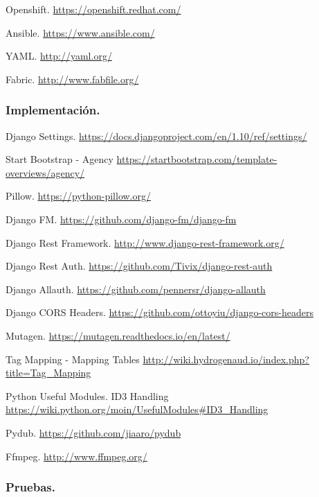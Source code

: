  Openshift. \url{https://openshift.redhat.com/}

 Ansible. \url{https://www.ansible.com/}

 YAML. \url{http://yaml.org/}

 Fabric. \url{http://www.fabfile.org/}

\subsubsection*{Implementación.}

 Django Settings. \url{https://docs.djangoproject.com/en/1.10/ref/settings/}

 Start Bootstrap - Agency \url{https://startbootstrap.com/template-overviews/agency/}

 Pillow. \url{https://python-pillow.org/}

 Django FM. \url{https://github.com/django-fm/django-fm}

 Django Rest Framework. \url{http://www.django-rest-framework.org/}

 Django Rest Auth. \url{https://github.com/Tivix/django-rest-auth}

 Django Allauth. \url{https://github.com/pennersr/django-allauth} 

 Django CORS Headers. \url{https://github.com/ottoyiu/django-cors-headers}

 Mutagen. \url{https://mutagen.readthedocs.io/en/latest/}

 Tag Mapping - Mapping Tables \url{http://wiki.hydrogenaud.io/index.php?title=Tag_Mapping}

 Python Useful Modules. ID3 Handling \url{https://wiki.python.org/moin/UsefulModules#ID3_Handling}

 Pydub. \url{https://github.com/jiaaro/pydub}

 Ffmpeg. \url{http://www.ffmpeg.org/}

\subsubsection*{Pruebas.}

